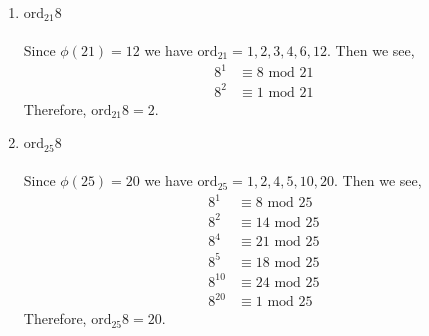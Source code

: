\documentclass[class=article, crop=false]{standalone}
\def\ord{{\text{ord}}}
\begin{document}
\subsubsection{}
\begin{enumerate}
  \item
    $\ord_{21}8$ \\\\
    Since $\phi(21)= 12$ we have $\ord_{21} = 1,2,3,4,6,12$. Then we see,
    \begin{align*}
      8^{1} &\equiv 8 \mbox{ mod } 21 \\
      8^{2} &\equiv 1 \mbox{ mod } 21
    \end{align*}
    Therefore, $\ord_{21} 8 = 2$.

  \item
    $\ord_{25}8$ \\\\
    Since $\phi(25)= 20$ we have $\ord_{25} = 1,2,4,5,10,20$. Then we see,
    \begin{align*}
      8^{1} &\equiv 8 \mbox{ mod } 25 \\
      8^{2} &\equiv 14 \mbox{ mod } 25 \\
      8^{4} &\equiv 21 \mbox{ mod } 25 \\
      8^{5} &\equiv 18 \mbox{ mod } 25 \\
      8^{10} &\equiv 24 \mbox{ mod } 25 \\
      8^{20} &\equiv 1 \mbox{ mod } 25
    \end{align*}
    Therefore, $\ord_{25} 8 = 20$.

  \end{enumerate}
\end{document}
